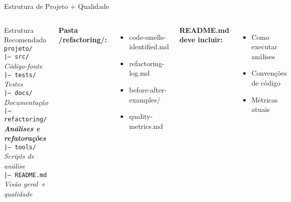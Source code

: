 \documentclass[10pt]{beamer}
\begin{document}
\begin{frame}{Estrutura de Projeto + Qualidade}
\begin{columns}[c]
\begin{block}{Estrutura Recomendada}
\texttt{projeto/}\\
\texttt{|-- src/} \hfill \textit{Código-fonte}\\
\texttt{|-- tests/} \hfill \textit{Testes}\\
\texttt{|-- docs/} \hfill \textit{Documentação}\\
\texttt{|-- refactoring/} \hfill \textit{\textbf{Análises e refatorações}}\\
\texttt{|-- tools/} \hfill \textit{Scripts de análise}\\
\texttt{|-- README.md} \hfill \textit{Visão geral + qualidade}
\end{block}

\textbf{Pasta /refactoring/:}
\begin{itemize}
    \item code-smells-identified.md
    \item refactoring-log.md
    \item before-after-examples/
    \item quality-metrics.md
\end{itemize}

\textbf{README.md deve incluir:}
\begin{itemize}
    \item Como executar análises
    \item Convenções de código
    \item Métricas atuais
\end{itemize}
\end{columns}
\end{frame}
\end{document}

